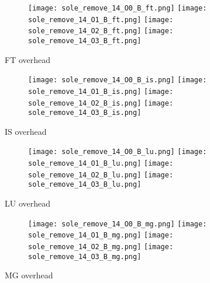 \documentclass[11pt]{article}
\begin{document}
    \begin{figure}[!htb]
        \begin{subfigure}{\linewidth}
            \texttt{[image: sole\_remove\_14\_O0\_B\_ft.png]}
            \texttt{[image: sole\_remove\_14\_O1\_B\_ft.png]}
            \texttt{[image: sole\_remove\_14\_O2\_B\_ft.png]}
            \texttt{[image: sole\_remove\_14\_O3\_B\_ft.png]}
        \end{subfigure}\par\medskip
        \caption{FT overhead}\label{fig:figure4}
    \end{figure}
\begin{figure}[!htb]
        \begin{subfigure}{\linewidth}
            \texttt{[image: sole\_remove\_14\_O0\_B\_is.png]}\hfill
            \texttt{[image: sole\_remove\_14\_O1\_B\_is.png]}\hfill
            \texttt{[image: sole\_remove\_14\_O2\_B\_is.png]}\hfill
            \texttt{[image: sole\_remove\_14\_O3\_B\_is.png]}\hfill
        \end{subfigure}\par\medskip
        \caption{IS overhead}\label{fig:figure5}
\end{figure}

    \begin{figure}[!htb]
        \begin{subfigure}{\linewidth}
            \texttt{[image: sole\_remove\_14\_O0\_B\_lu.png]}\hfill
            \texttt{[image: sole\_remove\_14\_O1\_B\_lu.png]}\hfill
            \texttt{[image: sole\_remove\_14\_O2\_B\_lu.png]}\hfill
            \texttt{[image: sole\_remove\_14\_O3\_B\_lu.png]}\hfill
        \end{subfigure}\par\medskip
        \caption{LU overhead}\label{fig:figure6}
    \end{figure}

    \begin{figure}[!htb]
        \begin{subfigure}{\linewidth}
            \texttt{[image: sole\_remove\_14\_O0\_B\_mg.png]}\hfill
            \texttt{[image: sole\_remove\_14\_O1\_B\_mg.png]}\hfill
            \texttt{[image: sole\_remove\_14\_O2\_B\_mg.png]}\hfill
            \texttt{[image: sole\_remove\_14\_O3\_B\_mg.png]}\hfill
        \end{subfigure}\par\medskip
        \caption{MG overhead}\label{fig:figure7}
    \end{figure}
\end{document}
